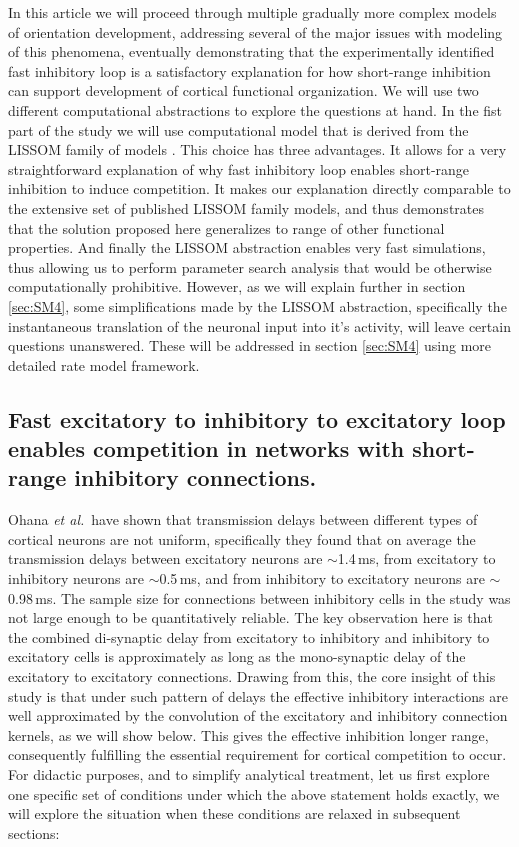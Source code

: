 \documentclass[utf8]{frontiersSCNS}
\newcommand{\etal}{\textit{et al.}}
\begin{document}
In this article we will proceed through multiple gradually more complex models of orientation development, addressing several 
of the major issues with modeling of this phenomena, eventually demonstrating that the experimentally identified fast inhibitory loop is a satisfactory explanation for how short-range inhibition can support development of cortical functional organization. We will use two different computational abstractions to explore the questions at hand. In the fist part of the study we will use computational model that is derived from the LISSOM family of models \citep{CMVC}. This choice has three advantages. It allows for a very straightforward explanation of why 
fast inhibitory loop enables short-range inhibition to induce competition. It makes our explanation directly comparable to the 
extensive set of published LISSOM family models, and thus demonstrates that the solution proposed here generalizes to range of other 
functional properties. And finally the LISSOM abstraction enables very fast simulations, thus allowing us to perform 
parameter search analysis that would be otherwise computationally prohibitive. However, as we will explain further in section \ref{sec:SM4}, some simplifications made by the LISSOM abstraction, specifically the instantaneous translation of the neuronal input into it's activity, will leave 
certain questions unanswered. These will be addressed in section \ref{sec:SM4} using more detailed rate model framework.


\subsection{Fast excitatory to inhibitory to excitatory loop enables competition in networks with short-range inhibitory connections.} \label{sec:SM1}

Ohana \etal\,\citep{Ohana2012} have shown that transmission delays between different types of cortical neurons are not uniform, specifically they found that on average the transmission delays  between excitatory neurons are $\sim$1.4\,ms, from excitatory to inhibitory neurons are $\sim$0.5\,ms, and from inhibitory to excitatory neurons are $\sim$0.98\,ms. The sample size for connections
between inhibitory cells in the study was not large enough to be quantitatively reliable. The key observation here is that the 
combined di-synaptic delay from excitatory to inhibitory and inhibitory to excitatory cells is approximately as long as the mono-synaptic delay
of the excitatory to excitatory connections. Drawing from this, the core insight of this study is that under such pattern of delays
the effective inhibitory interactions are well approximated by the convolution of the excitatory and inhibitory connection kernels, as we will
show below. This gives the effective inhibition longer range, consequently fulfilling the essential requirement for cortical competition to occur.
For didactic purposes, and to simplify analytical treatment, let us first explore one specific set of conditions under which the above statement holds exactly, we will explore the situation when these conditions are relaxed in subsequent sections: 
\end{document}
